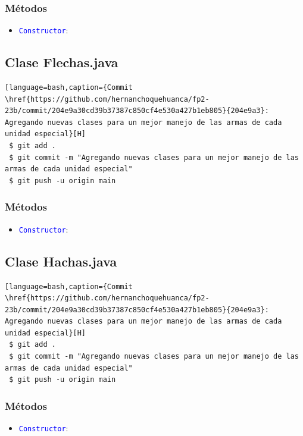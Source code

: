 \documentclass{article}
\begin{document}
\subsubsection{Métodos}
\begin{itemize}
    \item \texttt{\textcolor{blue}{Constructor}}: 
\end{itemize}



\subsection{Clase Flechas.java}
\begin{lstlisting}[language=bash,caption={Commit \href{https://github.com/hernanchoquehuanca/fp2-23b/commit/204e9a30cd39b37387c850cf4e530a427b1eb805}{204e9a3}: Agregando nuevas clases para un mejor manejo de las armas de cada unidad especial}[H]
 $ git add .
 $ git commit -m "Agregando nuevas clases para un mejor manejo de las armas de cada unidad especial"			
 $ git push -u origin main
\end{lstlisting}

\subsubsection{Métodos}
\begin{itemize}
    \item \texttt{\textcolor{blue}{Constructor}}: 
\end{itemize}



\newpage
\subsection{Clase Hachas.java}
\begin{lstlisting}[language=bash,caption={Commit \href{https://github.com/hernanchoquehuanca/fp2-23b/commit/204e9a30cd39b37387c850cf4e530a427b1eb805}{204e9a3}: Agregando nuevas clases para un mejor manejo de las armas de cada unidad especial}[H]
 $ git add .
 $ git commit -m "Agregando nuevas clases para un mejor manejo de las armas de cada unidad especial"			
 $ git push -u origin main
\end{lstlisting}

\subsubsection{Métodos}
\begin{itemize}
    \item \texttt{\textcolor{blue}{Constructor}}: 
\end{itemize}

\end{document}
